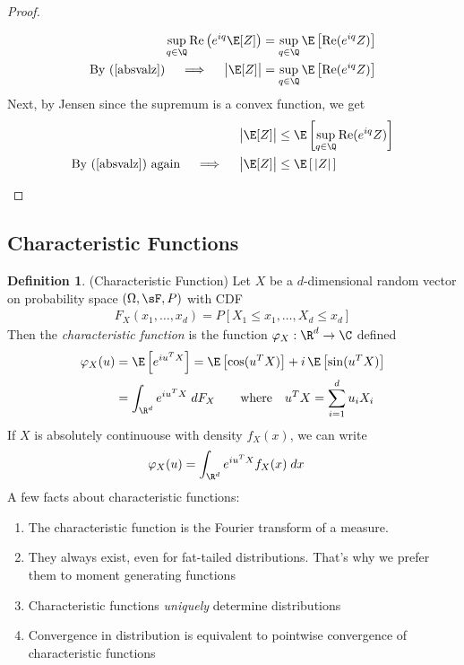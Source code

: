 \documentclass[12pt]{article}
\theoremstyle{plain}
\theoremstyle{definition}
\newtheorem{defn}[thm]{Definition}
\theoremstyle{remark}
\newcommand{\ra}{\rightarrow}
\renewcommand{\Re}{\operatorname{Re}}
\begin{document}
\begin{proof}
\begin{enumerate}
    \begin{align*}
      \sup_{q\in\Q}\Re\left(e^{iq}\E[Z]\right)
      &= \sup_{q\in\Q}\E\left[\Re(e^{iq}Z)\right] \\
      \text{By (\ref{absvalz})}\quad\implies\quad
      \big|\E[Z]\big|
      &= \sup_{q\in\Q}\E\left[\Re(e^{iq}Z)\right]
    \end{align*}
    Next, by Jensen since the supremum is a convex function, we get
    \begin{align*}
      \big|\E[Z]\big|
      &\leq \E\left[\sup_{q\in\Q}\Re(e^{iq}Z)\right] \\
      \text{By (\ref{absvalz}) again}\quad\implies\quad
      \big|\E[Z]\big|
      &\leq \E\left[\,|Z|\,\right]
    \end{align*}

\end{enumerate}
\end{proof}


\clearpage
\subsection{Characteristic Functions}



\begin{defn}(Characteristic Function)
Let $X$ be a $d$-dimensional random vector on probability space
$(\Omega,\sF,P)$ with CDF
\begin{align*}
  F_{X}(x_1,\ldots,x_d)
  =
  P[X_1\leq x_1,\ldots, X_d\leq x_d]
\end{align*}
Then the \emph{characteristic function} is the function
$\varphi_X:\R^d\ra \C$ defined
\begin{align*}
  \varphi_X(u)
  &= \E\left[e^{iu^TX}\right]
  = \E\left[\cos(u^TX)\right]+i\,\E\left[\sin(u^TX)\right]\\
  &= \int_{\R^d} e^{iu^TX} \; dF_{X}
  \qquad\text{where}\quad u^T X = \sum_{i=1}^d u_iX_i
\end{align*}
If $X$ is absolutely continuouse with density $f_{X}(x)$, we
can write
\begin{align*}
  \varphi_X(u)
  &=
  \int_{\R^d} e^{iu^TX} f_{X}(x)\; dx
\end{align*}
A few facts about characteristic functions:
\begin{enumerate}[label=(\roman*)]
  \item The characteristic function is the Fourier transform of a
    measure.
  \item They always exist, even for fat-tailed distributions. That's why
    we prefer them to moment generating functions
  \item Characteristic functions \emph{uniquely} determine distributions
  \item Convergence in distribution is equivalent to pointwise
    convergence of characteristic functions
\end{enumerate}
\end{defn}
\end{document}
